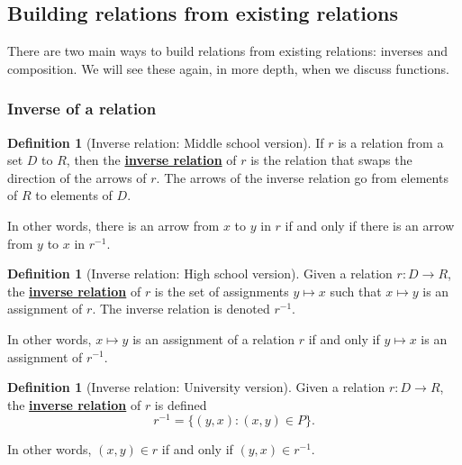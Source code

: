 \documentclass[11pt]{article}
\newcommand\st{:}
\renewcommand\emph[1]{\underline{\bf{#1}}} %
\theoremstyle{definition}
\newtheorem{definition}[theorem]{Definition}
\begin{document}
\subsection{Building relations from existing relations}

There are two main ways to build relations from existing relations: inverses and composition. We will see these again, in more depth, when we discuss functions.

\subsubsection{Inverse of a relation}

\begin{definition}[Inverse relation: Middle school version]\label{d: inverse relation middle school}
If $r$ is a relation from a set $D$ to $R$, then the \emph{inverse relation} of $r$ is the relation that swaps the direction of the arrows of $r$.  The arrows of the inverse relation go from elements of $R$ to elements of $D$.

In other words, there is an arrow from $x$ to $y$ in $r$ if and only if there is an arrow from $y$ to $x$ in $r^{-1}$.
\end{definition}

\begin{definition}[Inverse relation: High school version]\label{d: inverse relation high school}
Given a relation $r:D\to R$, the \emph{inverse relation} of $r$ is the set of assignments $y\mapsto x$ such that $x\mapsto y$ is an assignment of $r$. The inverse relation is denoted $r^{-1}$. 

In other words, $x\mapsto y$ is an assignment of a relation $r$ if and only if $y\mapsto x$ is an assignment of $r^{-1}$. 
\end{definition}

\begin{definition}[Inverse relation: University version]\label{d: inverse relation university}
Given a relation $r:D\to R$, the \emph{inverse relation} of $r$ is defined  
	$$r^{-1} = \{(y, x) \st (x,y)\in P\}.$$
	
In other words,	$(x,y)\in  r$ if and only if $(y,x)\in r^{-1}$.
\end{definition}
\end{document}
